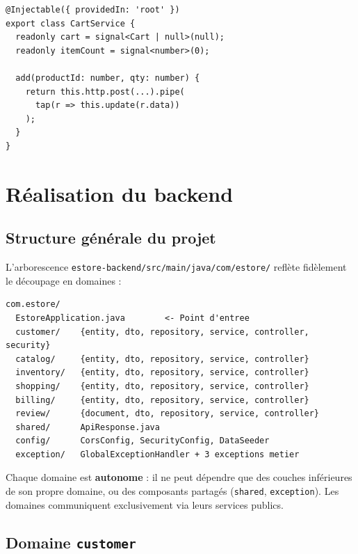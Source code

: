 \documentclass[11pt,a4paper,oneside]{report}
\begin{document}
\begin{lstlisting}[style=tsstyle, caption=Utilisation de signals dans CartService]
@Injectable({ providedIn: 'root' })
export class CartService {
  readonly cart = signal<Cart | null>(null);
  readonly itemCount = signal<number>(0);

  add(productId: number, qty: number) {
    return this.http.post(...).pipe(
      tap(r => this.update(r.data))
    );
  }
}
\end{lstlisting}

\chapter{Réalisation du backend}

\section{Structure générale du projet}

L'arborescence \texttt{estore-backend/src/main/java/com/estore/} reflète
fidèlement le découpage en domaines :

\begin{lstlisting}[style=shellstyle]
com.estore/
  EstoreApplication.java        <- Point d'entree
  customer/    {entity, dto, repository, service, controller, security}
  catalog/     {entity, dto, repository, service, controller}
  inventory/   {entity, dto, repository, service, controller}
  shopping/    {entity, dto, repository, service, controller}
  billing/     {entity, dto, repository, service, controller}
  review/      {document, dto, repository, service, controller}
  shared/      ApiResponse.java
  config/      CorsConfig, SecurityConfig, DataSeeder
  exception/   GlobalExceptionHandler + 3 exceptions metier
\end{lstlisting}

Chaque domaine est \textbf{autonome} : il ne peut dépendre que des couches
inférieures de son propre domaine, ou des composants partagés
(\texttt{shared}, \texttt{exception}). Les domaines communiquent
exclusivement via leurs services publics.

\section{Domaine \texttt{customer}}
\end{document}
